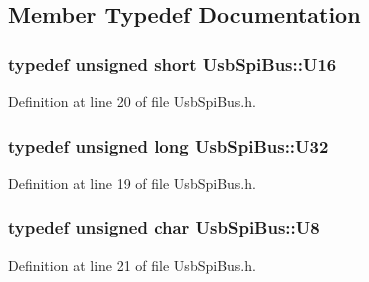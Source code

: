 \subsection{Member Typedef Documentation}
\hypertarget{classUsbSpiBus_a741e3c698b080973693ceb990017a560}{
\subsubsection[{U16}]{\setlength{\rightskip}{0pt plus 5cm}typedef unsigned short {\bf UsbSpiBus::U16}}}
\label{classUsbSpiBus_a741e3c698b080973693ceb990017a560}


Definition at line 20 of file UsbSpiBus.h.\hypertarget{classUsbSpiBus_a9b24e28662a35ca57f5ed32c41c5f3ff}{
\subsubsection[{U32}]{\setlength{\rightskip}{0pt plus 5cm}typedef unsigned long {\bf UsbSpiBus::U32}}}
\label{classUsbSpiBus_a9b24e28662a35ca57f5ed32c41c5f3ff}


Definition at line 19 of file UsbSpiBus.h.\hypertarget{classUsbSpiBus_a11336f4ad104fbd4fb454be044f19fc8}{
\subsubsection[{U8}]{\setlength{\rightskip}{0pt plus 5cm}typedef unsigned char {\bf UsbSpiBus::U8}}}
\label{classUsbSpiBus_a11336f4ad104fbd4fb454be044f19fc8}


Definition at line 21 of file UsbSpiBus.h.

